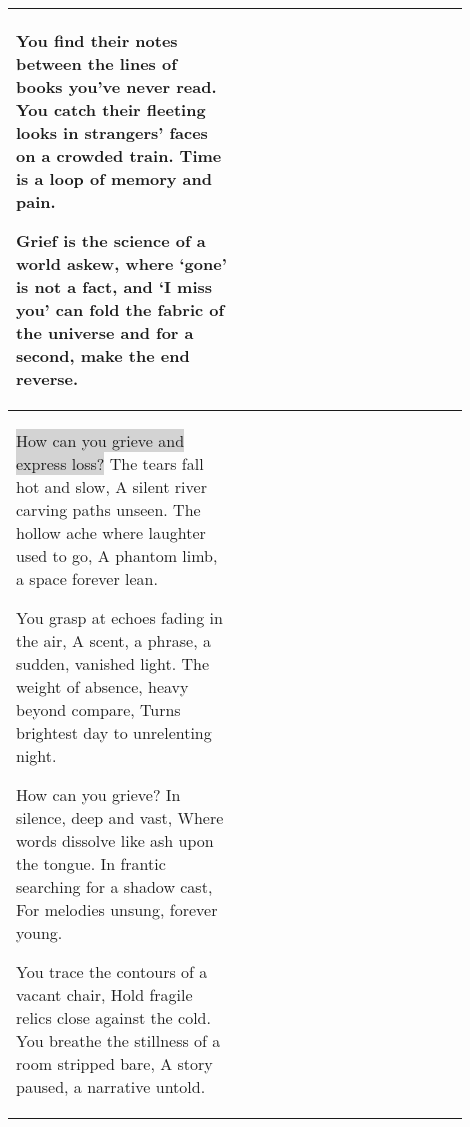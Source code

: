 \begin{table}[!htbp]
{\begin{tabular}{p{0.45\linewidth}p{0.45\linewidth}}
    You find their notes between the lines of books you've never read. 
    You catch their fleeting looks in strangers' faces on a crowded train. 
    Time is a loop of memory and pain. \par\medskip

    Grief is the science of a world askew, 
    where `gone' is not a fact, and `I miss you' 
    can fold the fabric of the universe 
    and for a second, make the end reverse. \\
    \midrule
    \colorbox{LightGray}{How can you grieve and express loss?} The tears fall hot and slow,
    A silent river carving paths unseen.
    The hollow ache where laughter used to go,
    A phantom limb, a space forever lean. \par\medskip
    
    You grasp at echoes fading in the air,
    A scent, a phrase, a sudden, vanished light.
    The weight of absence, heavy beyond compare,
    Turns brightest day to unrelenting night. \par\medskip
    
    How can you grieve? In silence, deep and vast,
    Where words dissolve like ash upon the tongue.
    In frantic searching for a shadow cast,
    For melodies unsung, forever young. \par\medskip
    
    You trace the contours of a vacant chair,
    Hold fragile relics close against the cold.
    You breathe the stillness of a room stripped bare,
    A story paused, a narrative untold. \par\medskip
    

\end{tabular}}
\end{table}
